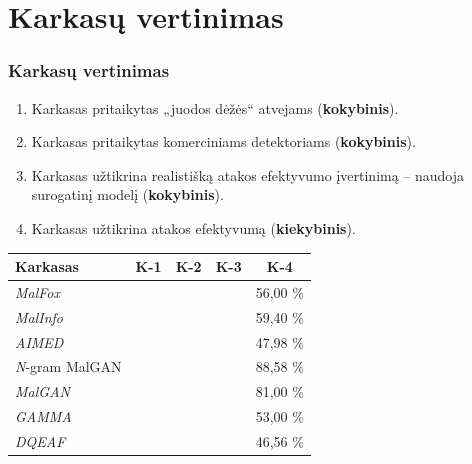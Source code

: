 \documentclass[12pt]{beamer}
\newcommand{\enquote}[1]{„#1“}
\newcommand{\cmark}{\ding{51}}%
\newcommand{\xmark}{\ding{55}}%
\newenvironment{criteriaTable}{
    \newcommand{\rowLast}[1]{##1}
    \newcommand{\row}[1]{##1 \\}
    \newcommand{\tbl}[1]{\gdef\Table{##1}}

    \def\Table{}
}{
    \begin{table}[h]
        \centering
        \begin{tabular}{l|c|c|c|S}
            \row{
            \textbf{Karkasas} & 
            \textbf{K-1}      & 
            \textbf{K-2}      & 
            \textbf{K-3}      & 
                \textbf{K-4}
            } \midrule
            \Table{}
        \end{tabular}
    \end{table}
}
\begin{document}
\section{Karkasų vertinimas}
\begin{frame}
    \frametitle{Karkasų vertinimas}
    \begin{enumerate}[K-1.]
        \item Karkasas pritaikytas \enquote{juodos dėžės} atvejams (\textbf{kokybinis}).\pause
        \item Karkasas pritaikytas komerciniams detektoriams (\textbf{kokybinis}).\pause
        \item Karkasas užtikrina realistišką atakos efektyvumo įvertinimą -- naudoja
              surogatinį modelį (\textbf{kokybinis}).\pause
        \item Karkasas užtikrina atakos efektyvumą (\textbf{kiekybinis}).
    \end{enumerate}\pause

    \begin{criteriaTable}
        \tbl{
            \row{ \textit{MalFox}        & \cmark{} & \cmark{} & \cmark{} & 56,00 \;\%}
            \row{ \textit{MalInfo}       & \cmark{} & \cmark{} & \xmark{} & 59,40 \;\%}
            \row{ \textit{AIMED}         & \cmark{} & \cmark{} & \xmark{} & 47,98 \;\%}
            \row{ \textit{N}-gram MalGAN & \cmark{} & \xmark{} & \cmark{} & 88,58 \;\%}
            \row{ \textit{MalGAN}        & \cmark{} & \xmark{} & \cmark{} & 81,00 \;\%}
            \row{ \textit{GAMMA}         & \cmark{} & \xmark{} & \xmark{} & 53,00 \;\%}
            \rowLast{ \textit{DQEAF}     & \cmark{} & \xmark{} & \xmark{} & 46,56 \;\%}
        }
    \end{criteriaTable}

\end{frame}
\end{document}
